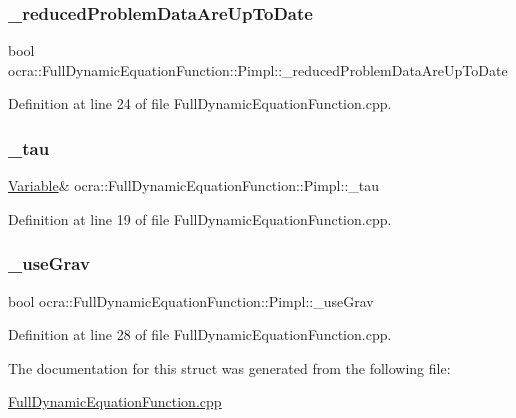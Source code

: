\subsubsection{\texorpdfstring{\+\_\+reduced\+Problem\+Data\+Are\+Up\+To\+Date}{\_reducedProblemDataAreUpToDate}}
{\footnotesize\ttfamily bool ocra\+::\+Full\+Dynamic\+Equation\+Function\+::\+Pimpl\+::\+\_\+reduced\+Problem\+Data\+Are\+Up\+To\+Date}



Definition at line 24 of file Full\+Dynamic\+Equation\+Function.\+cpp.

\hypertarget{structFullDynamicEquationFunction_1_1Pimpl_a952d62f65cebf67e50d0d6a091f937c4}{}\label{structFullDynamicEquationFunction_1_1Pimpl_a952d62f65cebf67e50d0d6a091f937c4} 
\subsubsection{\texorpdfstring{\+\_\+tau}{\_tau}}
{\footnotesize\ttfamily \hyperlink{classocra_1_1Variable}{Variable}\& ocra\+::\+Full\+Dynamic\+Equation\+Function\+::\+Pimpl\+::\+\_\+tau}



Definition at line 19 of file Full\+Dynamic\+Equation\+Function.\+cpp.

\hypertarget{structFullDynamicEquationFunction_1_1Pimpl_a7a8eb59e31eca20e45bd63f2975ff27b}{}\label{structFullDynamicEquationFunction_1_1Pimpl_a7a8eb59e31eca20e45bd63f2975ff27b} 
\subsubsection{\texorpdfstring{\+\_\+use\+Grav}{\_useGrav}}
{\footnotesize\ttfamily bool ocra\+::\+Full\+Dynamic\+Equation\+Function\+::\+Pimpl\+::\+\_\+use\+Grav}



Definition at line 28 of file Full\+Dynamic\+Equation\+Function.\+cpp.



The documentation for this struct was generated from the following file\+:\begin{DoxyCompactItemize}
\item 
\hyperlink{FullDynamicEquationFunction_8cpp}{Full\+Dynamic\+Equation\+Function.\+cpp}\end{DoxyCompactItemize}
